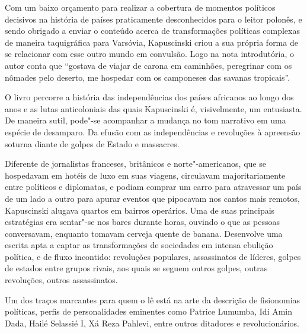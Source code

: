 Com um baixo orçamento para realizar a cobertura de momentos políticos
decisivos na história de países praticamente desconhecidos para o leitor
polonês, e sendo obrigado a enviar o conteúdo acerca de transformações
políticas complexas de maneira taquigráfica para Varsóvia, Kapuscinski
criou a sua própria forma de se relacionar com esse outro mundo em
convulsão. Logo na nota introdutória, o autor conta que ``gostava de
viajar de carona em caminhões, peregrinar com os nômades pelo deserto,
me hospedar com os camponeses das savanas tropicais''.

O livro percorre a história das independências dos países africanos ao
longo dos anos e as lutas anticoloniais das quais Kapuscinski é,
visivelmente, um entusiasta. De maneira sutil, pode"-se acompanhar a
mudança no tom narrativo em uma espécie de desamparo. Da efusão com as
independências e revoluções à apreensão soturna diante de golpes de
Estado e massacres.

Diferente de jornalistas franceses, britânicos e norte"-americanos, que
se hospedavam em hotéis de luxo em suas viagens, circulavam
majoritariamente entre políticos e diplomatas, e podiam comprar um carro
para atravessar um país de um lado a outro para apurar eventos que
pipocavam nos cantos mais remotos, Kapuscinski alugava quartos em
bairros operários. Uma de suas principais estratégias era
sentar"-se nos bares durante horas, ouvindo o que as pessoas conversavam,
enquanto tomavam cerveja quente de banana. Desenvolve uma escrita apta a
captar as transformações de sociedades em intensa ebulição política, e
de fluxo incontido: revoluções populares, assassinatos de líderes,
golpes de estados entre grupos rivais, aos quais se seguem outros
golpes, outras revoluções, outros assassinatos.

Um dos traços marcantes para quem o lê está na arte da descrição de
fisionomias políticas, perfis de personalidades eminentes como Patrice
Lumumba, Idi Amin Dada, Hailé Selassié I, Xá Reza Pahlevi, entre outros
ditadores e revolucionários. 

